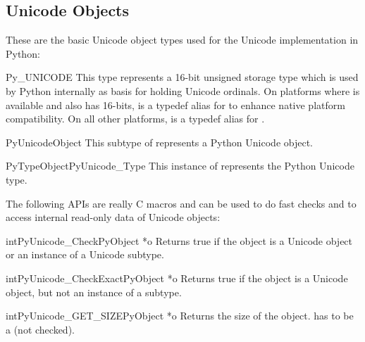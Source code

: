 \subsection{Unicode Objects \label{unicodeObjects}}


These are the basic Unicode object types used for the Unicode
implementation in Python:

\begin{ctypedesc}{Py_UNICODE}
  This type represents a 16-bit unsigned storage type which is used by
  Python internally as basis for holding Unicode ordinals.  On
  platforms where  is available and also has 16-bits,
   is a typedef alias for  to enhance
  native platform compatibility.  On all other platforms,
   is a typedef alias for .
\end{ctypedesc}

\begin{ctypedesc}{PyUnicodeObject}
  This subtype of  represents a Python Unicode object.
\end{ctypedesc}

\begin{cvardesc}{PyTypeObject}{PyUnicode_Type}
  This instance of  represents the Python Unicode
  type.
\end{cvardesc}

The following APIs are really C macros and can be used to do fast
checks and to access internal read-only data of Unicode objects:

\begin{cfuncdesc}{int}{PyUnicode_Check}{PyObject *o}
  Returns true if the object  is a Unicode object or an
  instance of a Unicode subtype.
\end{cfuncdesc}

\begin{cfuncdesc}{int}{PyUnicode_CheckExact}{PyObject *o}
  Returns true if the object  is a Unicode object, but not an
  instance of a subtype.
\end{cfuncdesc}

\begin{cfuncdesc}{int}{PyUnicode_GET_SIZE}{PyObject *o}
  Returns the size of the object.   has to be a
   (not checked).
\end{cfuncdesc}

